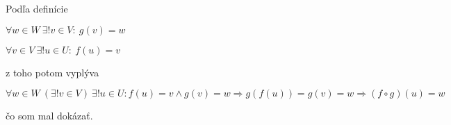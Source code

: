 
Podľa definície

$\forall w\in W~\exists ! v\in V:~g(v)=w$

$\forall v\in V~\exists ! u\in U:~f(u)=v$

z toho potom vyplýva

$$\forall w\in W~(\exists !v\in V)~\exists ! u\in U: f(u)=v\wedge g(v)=w
\Rightarrow g(f(u))=g(v)=w\Rightarrow (f\circ g)(u)=w$$

čo som mal dokázať.

